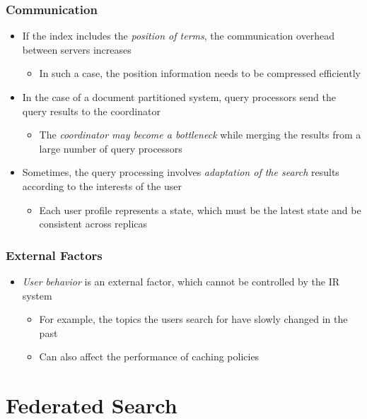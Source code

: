 \documentclass{beamer}
\begin{document}
\begin{frame}
    \frametitle{Communication}
    \begin{itemize}
    \item If the index includes the \emph{position of terms}, the communication
        overhead between servers increases
        \begin{itemize}
        \item In such a case, the position information needs to be compressed
            efficiently
        \end{itemize}
    \item In the case of a document partitioned system, query processors send
        the query results to the coordinator
        \begin{itemize}
        \item The \emph{coordinator may become a bottleneck} while merging the
            results from a large number of query processors
        \end{itemize}
    \item Sometimes, the query processing involves \emph{adaptation of the
          search} results according to the interests of the user
        \begin{itemize}
        \item Each user profile represents a state, which must be the latest
            state and be consistent across replicas
        \end{itemize}
    \end{itemize}
\end{frame}

\begin{frame}
    \frametitle{External Factors}
    \begin{itemize}
    \item \emph{User behavior} is an external factor, which cannot be
        controlled by the IR system
        \begin{itemize}
        \item For example, the topics the users search for have slowly changed
            in the past
        \item Can also affect the performance of caching policies
        \end{itemize}
    \end{itemize}
\end{frame}

\section{Federated Search}
\end{document}
